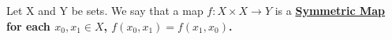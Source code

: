 \label{def:Symmetricmap}
\newcommand{\SymmetricMap}[0]{
    \bf \hyperref[def:Symmetricmap]{Symmetric Map} \rm
}
\begin{df}
    
    Let X and Y be sets. 
    We say that a map $f:X \times X \to Y$ is a \SymmetricMap for each $x_0,x_1 \in X$, $f(x_0,x_1)=f(x_1,x_0)$.
\end{df} 